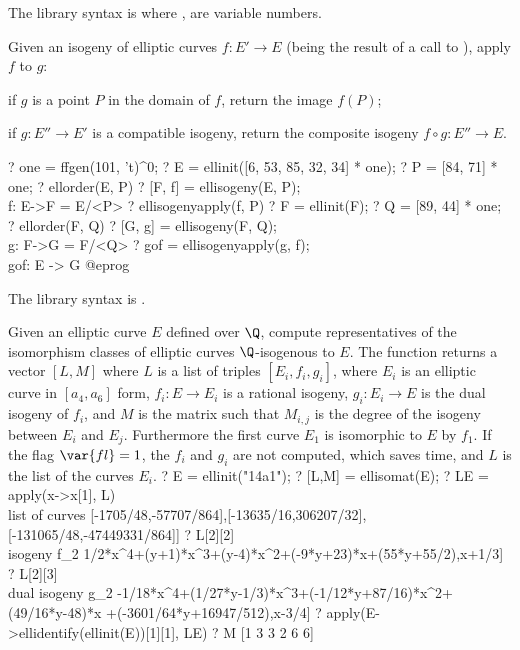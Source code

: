 The library syntax is  where ,  are variable numbers.

\label{se:ellisogenyapply}
Given an isogeny of elliptic curves $f:E'\to E$ (being the result of a call
to ), apply $f$ to $g$:

\item if $g$ is a point $P$ in the domain of $f$, return the image $f(P)$;

\item if $g:E''\to E'$ is a compatible isogeny, return the composite
isogeny $f \circ g:  E''\to E$.

\bprog
? one = ffgen(101, 't)^0;
? E = ellinit([6, 53, 85, 32, 34] * one);
? P = [84, 71] * one;
? ellorder(E, P)
? [F, f] = ellisogeny(E, P);  \\ f: E->F = E/<P>
? ellisogenyapply(f, P)
? F = ellinit(F);
? Q = [89, 44] * one;
? ellorder(F, Q)
? [G, g] = ellisogeny(F, Q); \\  g: F->G = F/<Q>
? gof = ellisogenyapply(g, f); \\ gof: E -> G
@eprog

The library syntax is .

\label{se:ellisomat}
Given an elliptic curve $E$ defined over $\Q$, compute representatives of the
isomorphism classes of elliptic curves $\Q$-isogenous to $E$. The function
returns a vector $[L,M]$ where $L$ is a list of triples $[E_i, f_i, g_i]$,
where $E_i$ is an elliptic curve in $[a_4,a_6]$ form, $f_i: E \to E_i$
is a rational isogeny, $g_i: E_i \to E$ is the dual isogeny of $f_i$,
and $M$ is the matrix such that $M_{i,j}$ is the degree of the isogeny between
$E_i$ and $E_j$. Furthermore the first curve $E_1$ is isomorphic to $E$
by $f_1$. If the flag $\var{fl}=1$, the $f_i$ and $g_i$ are not computed,
which saves time, and $L$ is the list of the curves $E_i$.
\bprog
? E = ellinit("14a1");
? [L,M] = ellisomat(E);
? LE = apply(x->x[1], L)  \\ list of curves
     [-1705/48,-57707/864],[-13635/16,306207/32],[-131065/48,-47449331/864]]
? L[2][2]  \\ isogeny f_2
      1/2*x^4+(y+1)*x^3+(y-4)*x^2+(-9*y+23)*x+(55*y+55/2),x+1/3]
? L[2][3]  \\ dual isogeny g_2
      -1/18*x^4+(1/27*y-1/3)*x^3+(-1/12*y+87/16)*x^2+(49/16*y-48)*x
      +(-3601/64*y+16947/512),x-3/4]
? apply(E->ellidentify(ellinit(E))[1][1], LE)
? M
[1  3  3 2  6  6]

